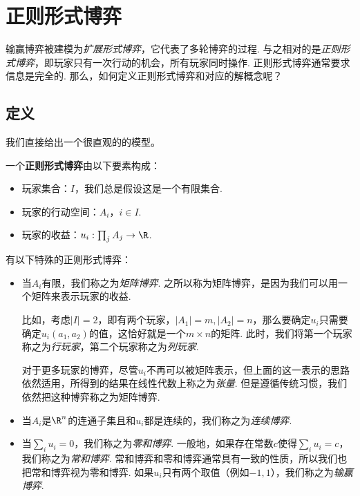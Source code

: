 \section{正则形式博弈}
输赢博弈被建模为\emph{扩展形式博弈}，它代表了多轮博弈的过程. 与之相对的是\emph{正则形式博弈}，即玩家只有一次行动的机会，所有玩家同时操作. 正则形式博弈通常要求信息是完全的. 那么，如何定义正则形式博弈和对应的解概念呢？

\subsection{定义}

我们直接给出一个很直观的的模型。

\begin{definition}[正则形式博弈]
一个\textbf{正则形式博弈}由以下要素构成：
\begin{itemize}
    \item 玩家集合：$I$，我们总是假设这是一个有限集合.
    \item 玩家的行动空间：$A_i$，$i\in I$.
    \item 玩家的收益：$u_i:\prod_j A_j\to\R$.
\end{itemize}
\end{definition}

有以下特殊的正则形式博弈：
\begin{itemize}
    \item 当$A_i$有限，我们称之为\emph{矩阵博弈}. 之所以称为矩阵博弈，是因为我们可以用一个矩阵来表示玩家的收益. 
    
    比如，考虑$|I|=2$，即有两个玩家，$|A_1|=m,|A_2|=n$，那么要确定$u_i$只需要确定$u_i(a_1,a_2)$的值，这恰好就是一个$m\times n$的矩阵. 此时，我们将第一个玩家称之为\emph{行玩家}，第二个玩家称之为\emph{列玩家}.

    对于更多玩家的博弈，尽管$u_i$不再可以被矩阵表示，但上面的这一表示的思路依然适用，所得到的结果在线性代数上称之为\emph{张量}. 但是遵循传统习惯，我们依然把这种博弈称之为矩阵博弈.

    \item 当$A_i$是$\R^n$的连通子集且和$u_i$都是连续的，我们称之为\emph{连续博弈}.
    \item 当$\sum_i u_i=0$，我们称之为\emph{零和博弈}. 一般地，如果存在常数$c$使得$\sum_i u_i=c$，我们称之为\emph{常和博弈}. 常和博弈和零和博弈通常具有一致的性质，所以我们也把常和博弈视为零和博弈. 如果$u_i$只有两个取值（例如$-1,1$），我们称之为\emph{输赢博弈}.
\end{itemize}


